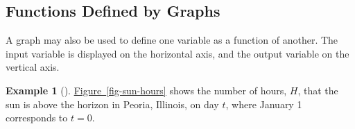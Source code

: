 \documentclass[10pt,]{book}
\theoremstyle{plain}
\theoremstyle{definition}
\theoremstyle{definition}
\newtheorem{example}[theorem]{Example}
\theoremstyle{definition}
\newlength{\panelmax}
\begin{document}
\subsection[{Functions Defined by Graphs}]{Functions Defined by Graphs}\label{subsection-3}
A graph may also be used to define one variable as a function of another. The input variable is displayed on the horizontal axis, and the output variable on the vertical axis.%
\begin{example}[]\label{example-sun-hours}
\hyperref[fig-sun-hours]{Figure~\ref{fig-sun-hours}}  shows the number of hours, \(H\), that the sun is above the horizon in Peoria, Illinois, on day \(t\), where January 1 corresponds to \(t = 0\).%
{%
\setlength{\panelmax}{0pt}
\newsavebox{\panelboxAparagraphs}
\newlength{\phAparagraphs}\setlength{\phAparagraphs}{\ht\panelboxAparagraphs+\dp\panelboxAparagraphs}
\settototalheight{\phAparagraphs}{\usebox{\panelboxAparagraphs}}
\setlength{\panelmax}{\maxof{\panelmax}{\phAparagraphs}}
\newsavebox{\panelboxAimage}
}
\end{example}
\end{document}

